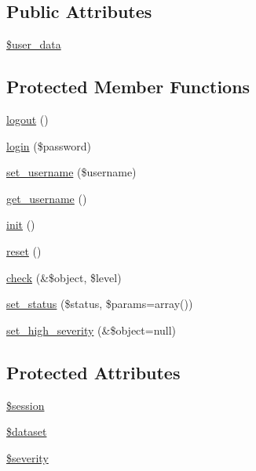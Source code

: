 \subsection*{Public Attributes}
\begin{DoxyCompactItemize}
\item 
\hyperlink{classUserHandler_ae7a2d59eee65560ac96b860e828bb445}{\$user\_\-data}
\end{DoxyCompactItemize}
\subsection*{Protected Member Functions}
\begin{DoxyCompactItemize}
\item 
\hyperlink{classUserHandler_a8000feaceda9d3c37fc56b6d1969b8f7}{logout} ()
\item 
\hyperlink{classUserHandler_a7a0b269a54d9430f48d6490c1fe14ecd}{login} (\$password)
\item 
\hyperlink{classUserHandler_afbcc9a275b547cca0bd4cff567b054a0}{set\_\-username} (\$username)
\item 
\hyperlink{classUserHandler_a76e8c8b88c8d92f2d03645e810b9253c}{get\_\-username} ()
\item 
\hyperlink{class__OWL_ae0ef3ded56e8a6b34b6461e5a721cd3e}{init} ()
\item 
\hyperlink{class__OWL_a2f2a042bcf31965194c03033df0edc9b}{reset} ()
\item 
\hyperlink{class__OWL_ad6f4f6946f40199dd0333cf219fa500e}{check} (\&\$object, \$level)
\item 
\hyperlink{class__OWL_aea912d0ede9b3c2a69b79072d94d4787}{set\_\-status} (\$status, \$params=array())
\item 
\hyperlink{class__OWL_a576829692a3b66e3d518853bf43abae3}{set\_\-high\_\-severity} (\&\$object=null)
\end{DoxyCompactItemize}
\subsection*{Protected Attributes}
\begin{DoxyCompactItemize}
\item 
\hyperlink{classUserHandler_af097b7fd1ee085b46a6c34e071508a7f}{\$session}
\item 
\hyperlink{classUserHandler_ac38c1ea50b2820ed03781bdbe8eb2e08}{\$dataset}
\item 
\hyperlink{class__OWL_ad26b40a9dbbacb33e299b17826f8327c}{\$severity}
\end{DoxyCompactItemize}
